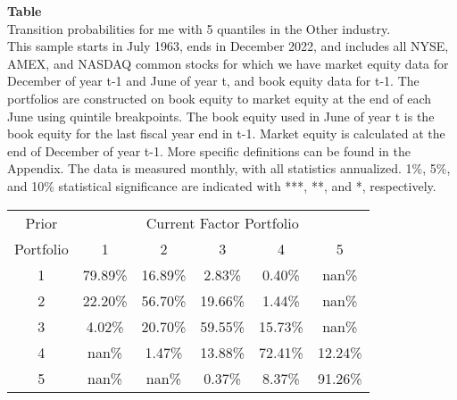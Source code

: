 \begin{table*}[ht!]
\raggedright
{}
\label{tab: transition_probs_me_Other_with_5_quantiles}
\textbf{Table \thetable} \\
Transition probabilities for me with 5 quantiles in the Other industry. \\
\hspace*{1em}This sample starts in July 1963, ends in December 2022, and includes all NYSE, AMEX, and NASDAQ common stocks for which we have market equity data for December of year t-1 and June of year t, and book equity data for t-1. The portfolios are constructed on book equity to market equity at the end of each June using quintile breakpoints.  The book equity used in June of year t is the book equity for the last fiscal year end in t-1.  Market equity is calculated at the end of December of year t-1.  More specific definitions can be found in the Appendix.  The data is measured monthly, with all statistics annualized.  1\%, 5\%, and 10\% statistical significance are indicated with ***, **, and *, respectively. \\
\vspace{0.5em}
\centering
\begin{adjustbox}{max width=\textwidth}
\begin{tabular}{@{}cccccc@{}}
\toprule
Prior & \multicolumn{5}{c}{Current Factor Portfolio} \\
Portfolio & 1 & 2 & 3 & 4 & 5 \\
\midrule
1 & 79.89\% & 16.89\% & 2.83\% & 0.40\% & nan\% \\
2 & 22.20\% & 56.70\% & 19.66\% & 1.44\% & nan\% \\
3 & 4.02\% & 20.70\% & 59.55\% & 15.73\% & nan\% \\
4 & nan\% & 1.47\% & 13.88\% & 72.41\% & 12.24\% \\
5 & nan\% & nan\% & 0.37\% & 8.37\% & 91.26\% \\
\bottomrule
\end{tabular}
\end{adjustbox}
\end{table*}